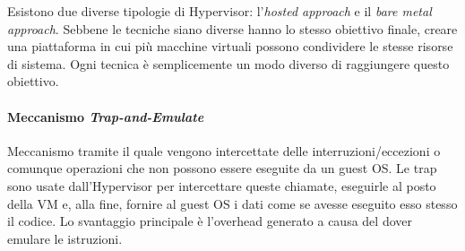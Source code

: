 \documentclass{article}
\begin{document}
Esistono due diverse tipologie di Hypervisor: l’\textit{hosted approach} e il \textit{bare metal approach}. Sebbene le tecniche siano diverse hanno lo stesso obiettivo finale, creare una piattaforma in cui più macchine virtuali possono condividere le stesse risorse di sistema. Ogni tecnica è semplicemente un modo diverso di raggiungere questo obiettivo.

\paragraph{Meccanismo \textit{Trap-and-Emulate}}
Meccanismo tramite il quale vengono intercettate delle interruzioni/eccezioni o comunque operazioni che non possono essere eseguite da un guest OS. Le trap sono usate dall'Hypervisor per intercettare queste chiamate, eseguirle al posto della VM e, alla fine, fornire al guest OS i dati come se avesse eseguito esso stesso il codice.
Lo svantaggio principale è l'overhead generato a causa del dover emulare le istruzioni.
\end{document}
